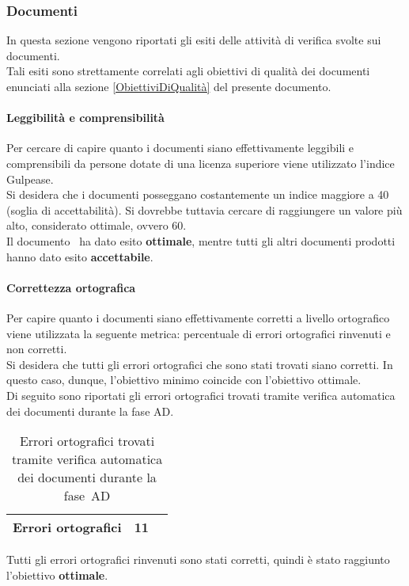 \documentclass[../PianoDiQualifica.tex]{subfiles}
\begin{document}
\begin{appendices}
		\subsubsection{Documenti}
		In questa sezione vengono riportati gli esiti delle attività di verifica svolte sui documenti.\\
		Tali esiti sono strettamente correlati agli obiettivi di qualità dei documenti enunciati alla sezione \ref{ObiettiviDiQualità} del presente documento.
			
			\paragraph{Leggibilità e comprensibilità}
			Per cercare di capire quanto i documenti siano effettivamente leggibili e comprensibili da persone dotate di una licenza superiore viene utilizzato l’indice Gulpease\g.\\
			Si desidera che i documenti posseggano costantemente un indice maggiore a 40 (soglia di accettabilità). Si dovrebbe tuttavia cercare di raggiungere un valore più alto, considerato ottimale, ovvero 60.\\
			Il documento \glossariov\ ha dato esito \textbf{ottimale}, mentre tutti gli altri documenti prodotti hanno dato esito \textbf{accettabile}.
			
			\paragraph{Correttezza ortografica}
			Per capire quanto i documenti siano effettivamente corretti a livello ortografico viene utilizzata la seguente metrica: percentuale di errori ortografici rinvenuti e non corretti.\\
			Si desidera che tutti gli errori ortografici che sono stati trovati siano corretti. In questo caso, dunque, l'obiettivo minimo coincide con l’obiettivo ottimale.\\
			Di seguito sono riportati gli errori ortografici trovati tramite verifica automatica dei documenti durante la fase AD.
			\begin{table}[H]
				\centering
				\begin{tabular}{l * {2}{c}}
					\midrule
					Errori ortografici & 11 \\
					\midrule
				\end{tabular}
				\caption{Errori ortografici trovati tramite verifica automatica dei documenti durante la fase\g\ AD}
				\label{tab:errori_automatica}
			\end{table}
			Tutti gli errori ortografici rinvenuti sono stati corretti, quindi è stato raggiunto l'obiettivo \textbf{ottimale}.
			

\end{appendices}
\end{document}
